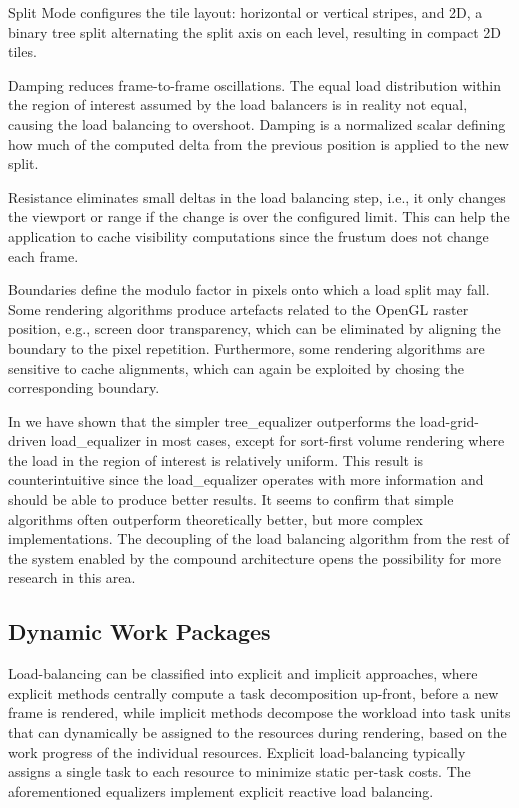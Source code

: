 \begin{compactdesc}
\item[Split Mode] configures the tile layout: horizontal or vertical stripes,
and 2D, a binary tree split alternating the split axis on each level, resulting
in compact 2D tiles.
\item[Damping] reduces frame-to-frame oscillations. The equal load distribution
within the region of interest assumed by the load balancers is in reality not
equal, causing the load balancing to overshoot. Damping is a normalized scalar
defining how much of the computed delta from the previous position is applied to
the new split.

\item[Resistance] eliminates small deltas in the load balancing step, i.e., it
only changes the viewport or range if the change is over the configured limit.
This can help the application to cache visibility computations since the
frustum does not change each frame.

\item[Boundaries] define the modulo factor in pixels onto which a load split may
fall. Some rendering algorithms produce artefacts related to the OpenGL raster
position, e.g., screen door transparency, which can be eliminated by aligning
the boundary to the pixel repetition. Furthermore, some rendering algorithms are
sensitive to cache alignments, which can again be exploited by chosing the
corresponding boundary.
\end{compactdesc}

In \cite{ESP:18} we have shown that the simpler \textsf{tree\_equalizer}
outperforms the load-grid-driven \textsf{load\_equalizer} in most cases, except
for sort-first volume rendering where the load in the region of interest is
relatively uniform. This result is counterintuitive since the
\textsf{load\_equalizer} operates with more information and should be able to
produce better results. It seems to confirm that simple algorithms often
outperform theoretically better, but more complex implementations. The
decoupling of the load balancing algorithm from the rest of the system enabled
by the compound architecture opens the possibility for more research in this
area.

\subsection{Dynamic Work Packages}

Load-balancing can be classified into explicit and implicit approaches, where
explicit methods centrally compute a task decomposition up-front, before a new
frame is rendered, while implicit methods decompose the workload into task
units that can dynamically be assigned to the resources during rendering, based
on the work progress of the individual resources. Explicit load-balancing
typically assigns a single task to each resource to minimize static per-task
costs. The aforementioned equalizers implement explicit reactive load
balancing.

